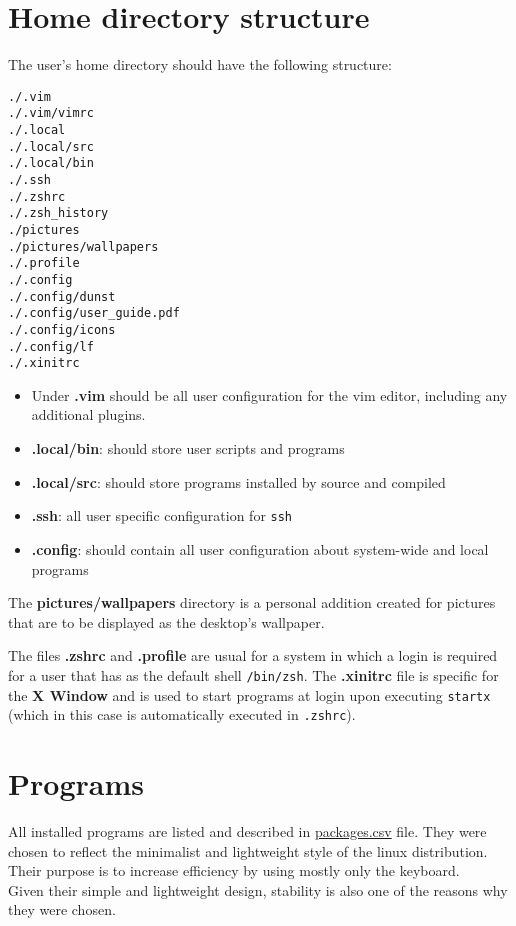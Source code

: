 \documentclass{article}
\begin{document}
\clearpage
\section{Home directory structure}

The user's home directory should have the following structure:
\begin{verbatim}
./.vim
./.vim/vimrc
./.local
./.local/src
./.local/bin
./.ssh
./.zshrc
./.zsh_history
./pictures
./pictures/wallpapers
./.profile
./.config
./.config/dunst
./.config/user_guide.pdf
./.config/icons
./.config/lf
./.xinitrc
\end{verbatim}
\begin{itemize}
	\item Under \textbf{.vim} should be all user configuration for the vim editor, including any additional plugins.
	\item \textbf{.local/bin}: should store user scripts and programs
	\item \textbf{.local/src}: should store programs installed by source and compiled
	\item \textbf{.ssh}: all user specific configuration for \texttt{ssh}
	\item \textbf{.config}: should contain all user configuration about system-wide and local programs
\end{itemize}

\noindent The \textbf{pictures/wallpapers} directory is a personal addition created for pictures that are to be displayed as the desktop's wallpaper.
\newline


\noindent The files \textbf{.zshrc} and \textbf{.profile} are usual for a system in which a login is required for a user that has as the default shell \texttt{/bin/zsh}. The \textbf{.xinitrc} file is specific for the \textbf{X Window} and is used to start programs at login upon executing \texttt{startx} (which in this case is automatically executed in \texttt{.zshrc}).

\clearpage

\section{Programs}

All installed programs are listed and described in \href{https://github.com/arghpy/individual_project/blob/main/packages.csv}{packages.csv} file.
\newline
\newline
\noindent They were chosen to reflect the minimalist and lightweight style of the linux distribution. Their purpose is to increase efficiency by using mostly only the keyboard.\\
Given their simple and lightweight design, stability is also one of the reasons why they were chosen.
\end{document}
